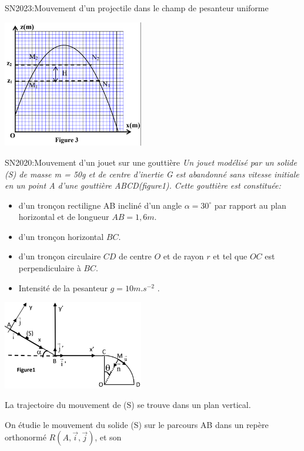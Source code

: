 \documentclass[12pt]{article}
\begin{document}
\begin{Box2}{SN2023:Mouvement d’un projectile dans le champ de pesanteur uniforme}
\begin{center}
	\includegraphics[width=0.46\textwidth]{./img/pos_courbe.png}
  \end{center}
 \end{Box2}


\begin{Box2}{SN2020:Mouvement d’un jouet sur une gouttière}
  \emph{Un jouet modélisé par un solide (S) de masse m = 50g et de centre d’inertie G est abandonné sans vitesse
initiale en un point A d’une gouttière ABCD(figure1). Cette gouttière est constituée:}

\begin{itemize}
  \item d’un tronçon rectiligne AB incliné d’un angle $\alpha =30^{\circ}$ par rapport au plan horizontal et de longueur
$AB = 1,6 m$.
\item d’un tronçon horizontal $BC$.
\item d’un tronçon circulaire $CD$ de centre $O$ et de rayon $r$ et tel que $OC$ est perpendiculaire à $BC$.
\item Intensité de la pesanteur $g =10m.s^{-2}$ .
\end{itemize}

  \begin{center}
	\includegraphics[width=0.46\textwidth]{./img/loi_exo.png}
  \end{center}

La trajectoire du mouvement de (S) se trouve dans un plan vertical.

  On étudie le mouvement du solide (S) sur le parcours AB dans un repère orthonormé $R(A,\vec{i}, \vec{j})$, et son


\end{Box2}
\end{document}
